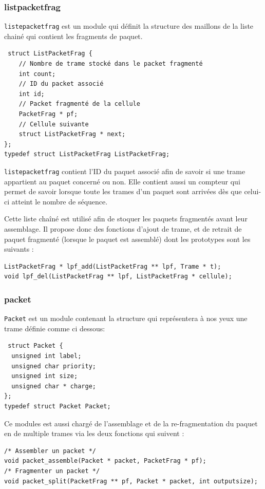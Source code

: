 \documentclass[a4paper,11pt]{article}
\begin{document}
\subsubsection{listpacketfrag}
\texttt{listepacketfrag} est un module qui définit la structure des
maillons de la liste chainé qui contient les fragments de paquet.
\begin{verbatim}
 struct ListPacketFrag {
    // Nombre de trame stocké dans le packet fragmenté
    int count;
    // ID du packet associé
    int id;
    // Packet fragmenté de la cellule
    PacketFrag * pf;
    // Cellule suivante
    struct ListPacketFrag * next;
};
typedef struct ListPacketFrag ListPacketFrag;
\end{verbatim}
\texttt{listepacketfrag} contient l'ID du paquet associé afin de savoir
si une trame appartient au paquet concerné ou non. Elle contient aussi
un compteur qui permet de savoir lorsque toute les trames d'un paquet
sont arrivées dès que celui-ci atteint le nombre de séquence.

Cette liste chaîné est utilisé afin de stoquer les paquets fragmentés
avant leur assemblage. Il propose donc des fonctions d'ajout de trame,
et de retrait de paquet fragmenté (lorsque le paquet est assemblé) dont
les prototypes sont les suivants :
\begin{verbatim}
ListPacketFrag * lpf_add(ListPacketFrag ** lpf, Trame * t);
void lpf_del(ListPacketFrag ** lpf, ListPacketFrag * cellule);
\end{verbatim}


\subsubsection{packet}
\texttt{Packet} est un module contenant la structure qui représentera à nos yeux une trame définie comme ci dessous:
\begin{verbatim}
 struct Packet {
  unsigned int label;
  unsigned char priority;
  unsigned int size;
  unsigned char * charge;
};
typedef struct Packet Packet;
\end{verbatim}
Ce modules est aussi chargé de l'assemblage et de la re-fragmentation du paquet en de multiple trames via les deux fonctions qui suivent :
\begin{verbatim}
/* Assembler un packet */
void packet_assemble(Packet * packet, PacketFrag * pf);
/* Fragmenter un packet */
void packet_split(PacketFrag ** pf, Packet * packet, int outputsize);
\end{verbatim}
\end{document}
